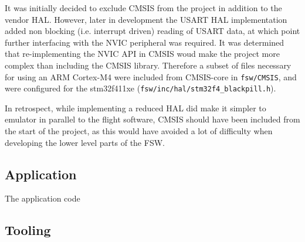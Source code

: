 \documentclass[../report.tex]{subfiles}
\begin{document}

It was initially decided to exclude CMSIS from the project in addition to the
vendor HAL. However, later in development the USART HAL implementation added
non blocking (i.e. interrupt driven) reading of USART data, at which point
further interfacing with the NVIC peripheral was required. It was determined
that re-implementing the NVIC API in CMSIS woud make the project more complex
than including the CMSIS library. Therefore a subset of files necessary for
using an ARM Cortex-M4 were included from CMSIS-core \citep{CMSIS} in
\lstinline|fsw/CMSIS|, and were configured for the stm32f411xe
(\lstinline|fsw/inc/hal/stm32f4_blackpill.h|).

In retrospect, while implementing a reduced HAL did make it simpler to emulator
in parallel to the flight software, CMSIS should have been included from the
start of the project, as this would have avoided a lot of difficulty when
developing the lower level parts of the FSW.

\subsection{Application}

The application code

\subsection{Tooling}



\end{document}
